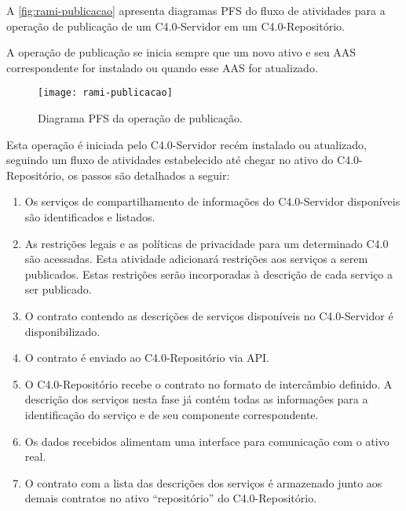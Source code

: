 A \autoref{fig:rami-publicacao} apresenta diagramas PFS do fluxo de atividades para a operação de publicação de um C4.0-Servidor em um C4.0-Repositório.

A operação de publicação se inicia sempre que um novo ativo e seu AAS correspondente for instalado ou quando esse AAS for atualizado.

\begin{figure}[htb]
	\centering
	\texttt{[image: rami-publicacao]}
	\caption{Diagrama PFS da operação de publicação.}
	\label{fig:rami-publicacao}
\end{figure}

Esta operação é iniciada pelo C4.0-Servidor recém instalado ou atualizado, seguindo um fluxo de atividades estabelecido até chegar no ativo do C4.0-Repositório, os passos são detalhados a seguir:

\begin{enumerate}

	\item Os serviços de compartilhamento de informações do C4.0-Servidor disponíveis são identificados e listados.

	\item As restrições legais e as políticas de privacidade para um determinado C4.0 são acessadas. Esta atividade adicionará restrições aos serviços a serem publicados. Estas restrições serão incorporadas à descrição de cada serviço a ser publicado.

	\item O contrato contendo as descrições de serviços disponíveis no C4.0-Servidor é disponibilizado.

	\item O contrato é enviado ao C4.0-Repositório via API.

	\item O C4.0-Repositório recebe o contrato no formato de intercâmbio definido. A descrição dos serviços nesta fase já contém todas as informações para a identificação do serviço e de seu componente correspondente.

	\item Os dados recebidos alimentam uma interface para comunicação com o ativo real.

	\item O contrato com a lista das descrições dos serviços é armazenado junto aos demais contratos no ativo ``repositório'' do C4.0-Repositório.

\end{enumerate}

